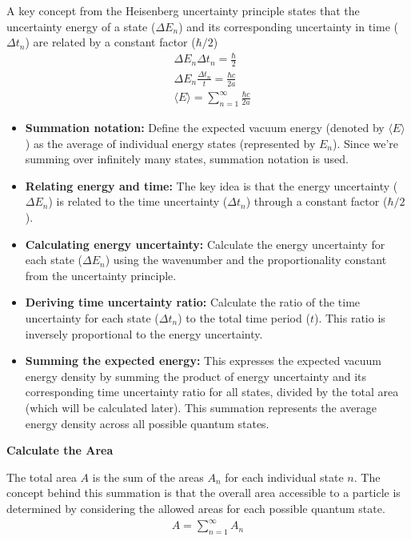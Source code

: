 A key concept from the Heisenberg uncertainty principle states that 
the uncertainty energy of a state ($\Delta E_n$) and its corresponding uncertainty in time ($\Delta t_n$) are related by a constant factor ($\hbar/2$)
\begin{align}
    &\Delta E_n \Delta t_n = \frac{\hbar}{2}\\
    &\Delta E_n \frac{\Delta t_n}{t} = \frac{\hbar c }{2 a}\\
    &\langle E \rangle = \sum_{n=1}^{\infty} \frac{\hbar c }{2 a}
\end{align}
\begin{itemize}
    \item \textbf{Summation notation:} Define the expected vacuum energy (denoted by $\langle E \rangle$ ) 
    as the average of individual energy states (represented by $E_n$). 
    Since we're summing over infinitely many states, summation notation is used.
    \item \textbf{Relating energy and time:} The key idea is that the energy uncertainty ($\Delta E_n$) is related 
    to the time uncertainty ($\Delta t_n$) through a constant factor ($\hbar/2$).
    \item \textbf{Calculating energy uncertainty:} Calculate the energy uncertainty for each state ($\Delta E_n$)
     using the wavenumber and the proportionality constant from the uncertainty principle.
    \item \textbf{Deriving time uncertainty ratio:} Calculate the ratio of the time uncertainty for each state ($\Delta t_n$)
     to the total time period ($t$). This ratio is inversely proportional to the energy uncertainty.
    \item \textbf{Summing the expected energy:} This expresses the expected vacuum energy density by summing 
    the product of energy uncertainty and its corresponding time uncertainty ratio for all states, 
    divided by the total area (which will be calculated later). 
    This summation represents the average energy density across all possible quantum states.
\end{itemize}
\noindent\textbf{Calculate the Area}
\par

The total area $A$ is the sum of the areas $A_n$ for each individual state $n$.
The concept behind this summation is that the overall area accessible to 
a particle is determined by considering the allowed areas for each possible quantum state.
\begin{align}
    A = \sum_{n=1}^{\infty}A_n
\end{align}

